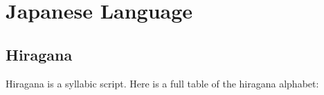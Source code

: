 

\chapter{Japanese Language}
\label{chap:japaneselanguage}

\section{Hiragana}
\label{sec:hiragana}

Hiragana is a syllabic script. Here is a full table of the hiragana alphabet:


